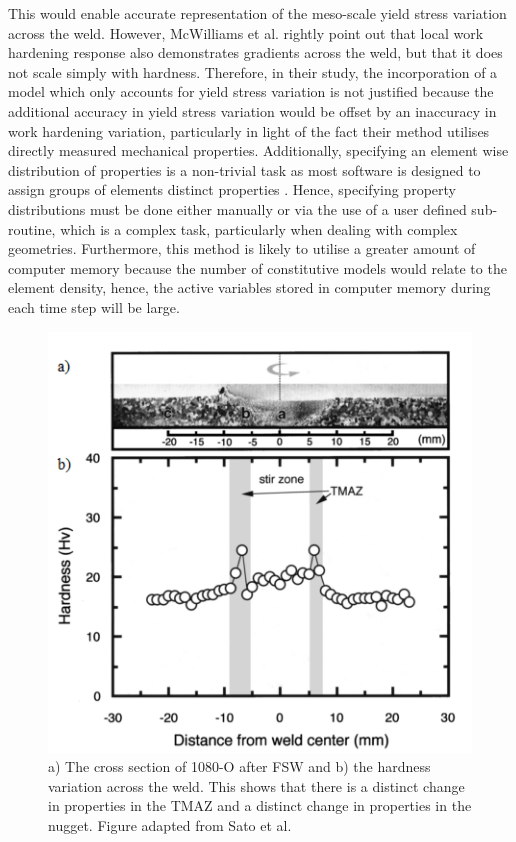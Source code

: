 This would enable accurate representation of the meso-scale yield stress variation across the weld. However, McWilliams et al. rightly point out that local work hardening response also demonstrates gradients across the weld, but that it does not scale simply with hardness. Therefore, in their study, the incorporation of a model which only accounts for yield stress variation is not justified because the additional accuracy in yield stress variation would be offset by an inaccuracy in work hardening variation, particularly in light of the fact their method utilises directly measured mechanical properties. Additionally, specifying an element wise distribution of properties is a non-trivial task as most software is designed to assign groups of elements distinct properties \cite{Hallquist2006}. Hence, specifying property distributions must be done either manually or via the use of a user defined sub-routine, which is a complex task, particularly when dealing with complex geometries. Furthermore, this method is likely to utilise a greater amount of computer memory because the number of constitutive models would relate to the element density, hence, the active variables stored in computer memory during each time step will be large. 

\begin{figure}[h!]
	\centering
	\includegraphics[width=0.6\linewidth]{Figures/LiteratureReview/FSWDistinctPropertyChange}
	\caption[Distinct property changes in FSW]{a) The cross section of 1080-O after FSW and b) the hardness variation across the weld. This shows that there is a distinct change in properties in the TMAZ and a distinct change in properties in the nugget. Figure adapted from Sato et al. \cite{Sato2001b}}
	\label{fig:FSWDistinctPropertyChange}
\end{figure}

